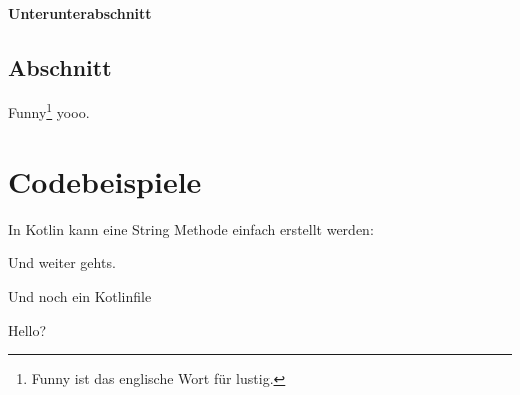 \subsubsection{Unterunterabschnitt}\label{subsubsec:example3-2-2}
\section{Abschnitt}\label{sec:example4}
Funny\footnote{Funny ist das englische Wort für lustig.} yooo.

\chapter{Codebeispiele}\label{ch:example5}
In Kotlin kann eine String Methode einfach erstellt werden:

Und weiter gehts.

Und noch ein Kotlinfile


Hello?